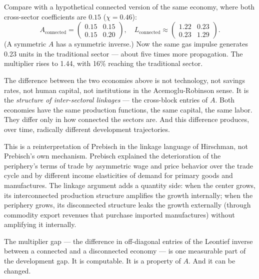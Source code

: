\documentclass[../structural_economics_book.tex]{subfiles}
\begin{document}
\begin{example}
Compare with a hypothetical connected version of the same economy, where both cross-sector coefficients are $0.15$ ($\chi = 0.46$):
\begin{equation}
A_{\text{connected}} = \begin{pmatrix} 0.15 & 0.15 \\ 0.15 & 0.20 \end{pmatrix}, \quad L_{\text{connected}} \approx \begin{pmatrix} 1.22 & 0.23 \\ 0.23 & 1.29 \end{pmatrix}.
\end{equation}
(A symmetric $A$ has a symmetric inverse.) Now the same gas impulse generates 0.23 units in the traditional sector --- about five times more propagation. The multiplier rises to 1.44, with 16\% reaching the traditional sector.
\end{example}

\begin{prebisch}
The difference between the two economies above is not technology, not savings rates, not human capital, not institutions in the Acemoglu-Robinson sense. It is the \textit{structure of inter-sectoral linkages} --- the cross-block entries of $A$. Both economies have the same production functions, the same capital, the same labor. They differ only in how connected the sectors are. And this difference produces, over time, radically different development trajectories.

This is a reinterpretation of Prebisch in the linkage language of Hirschman, not Prebisch's own mechanism. Prebisch explained the deterioration of the periphery's terms of trade by asymmetric wage and price behavior over the trade cycle and by different income elasticities of demand for primary goods and manufactures. The linkage argument adds a quantity side: when the center grows, its interconnected production structure amplifies the growth internally; when the periphery grows, its disconnected structure leaks the growth externally (through commodity export revenues that purchase imported manufactures) without amplifying it internally.

The multiplier gap --- the difference in off-diagonal entries of the Leontief inverse between a connected and a disconnected economy --- is one measurable part of the development gap. It is computable. It is a property of $A$. And it can be changed.
\end{prebisch}
\end{document}
